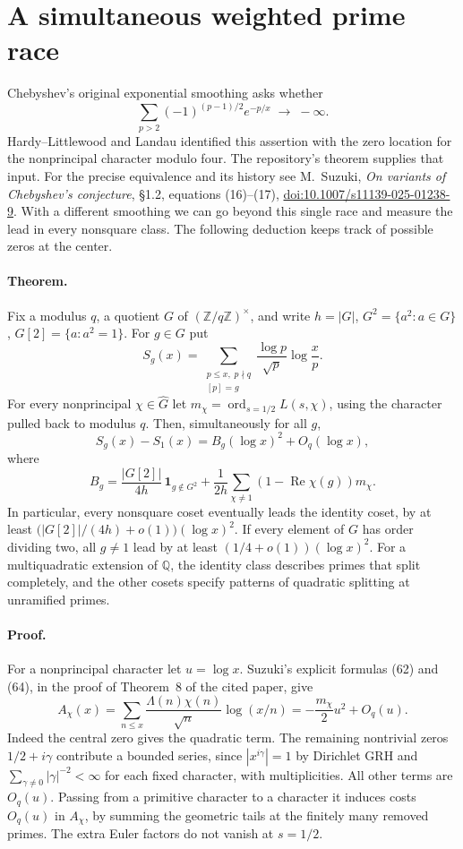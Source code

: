 \section{A simultaneous weighted prime race}\label{sec:weightedrace}

Chebyshev's original exponential smoothing asks whether
\[
   \sum_{p>2}(-1)^{(p-1)/2} e^{-p/x}\;\longrightarrow\;-\infty .
\]
Hardy--Littlewood and Landau identified this assertion with the zero
location for the nonprincipal character modulo four. The repository's theorem supplies
that input. For the precise equivalence and its history see M.~Suzuki,
\emph{On variants of Chebyshev's conjecture}, \S1.2, equations (16)--(17),
\href{https://doi.org/10.1007/s11139-025-01238-9}{doi:10.1007/s11139-025-01238-9}.
With a different smoothing we can go beyond this single race and
measure the lead in every nonsquare class. The following deduction keeps track of
possible zeros at the center.

\paragraph{Theorem.}
Fix a modulus $q$, a quotient $G$ of $(\mathbb Z/q\mathbb Z)^\times$,
and write $h=|G|$, $G^2=\{a^2:a\in G\}$, $G[2]=\{a:a^2=1\}$.
For $g\in G$ put
\[
 S_g(x)=\sum_{\substack{p\le x,\;p\nmid q\\ {[p]}=g}}
            \frac{\log p}{\sqrt p}\log\frac{x}{p}.
\]
For every nonprincipal $\chi\in\widehat G$ let
$m_\chi=\operatorname{ord}_{s=1/2} L(s,\chi)$, using the character
pulled back to modulus $q$. Then, simultaneously for all $g$,
\[
 S_g(x)-S_1(x)=B_g(\log x)^2+O_q(\log x),
\]
where
\[
 B_g=\frac{|G[2]|}{4h}\,\mathbf 1_{g\notin G^2}
    +\frac1{2h}\sum_{\chi\ne1}
       (1-\operatorname{Re}\chi(g))m_\chi .
\]
In particular, every nonsquare coset eventually leads the identity coset,
by at least $\bigl(|G[2]|/(4h)+o(1)\bigr)(\log x)^2$.
If every element of $G$ has order dividing two, all $g\ne1$ lead by
at least $(1/4+o(1))(\log x)^2$. For a multiquadratic extension of
$\mathbb Q$, the identity class describes primes that split completely,
and the other cosets specify patterns of quadratic splitting at unramified primes.

\paragraph{Proof.}
For a nonprincipal character let $u=\log x$. Suzuki's explicit formulas
(62) and (64), in the proof of Theorem~8 of the cited paper, give
\[
 A_\chi(x)=\sum_{n\le x}\frac{\Lambda(n)\chi(n)}{\sqrt n}\log(x/n)
      =-\frac{m_\chi}{2}u^2+O_q(u).
\]
Indeed the central zero gives the quadratic term. The remaining nontrivial
zeros $1/2+i\gamma$ contribute a bounded series, since
$|x^{i\gamma}|=1$ by Dirichlet GRH and
$\sum_{\gamma\ne0}|\gamma|^{-2}<\infty$ for each fixed character,
with multiplicities. All other terms are $O_q(u)$.
Passing from a primitive character to a character it induces costs
$O_q(u)$ in $A_\chi$, by summing the geometric tails at the finitely many
removed primes. The extra Euler factors do not vanish at $s=1/2$.

